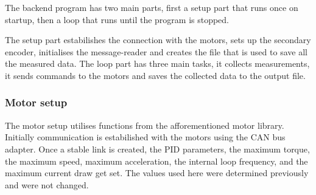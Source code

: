\documentclass[12pt]{article}
\begin{document}
The backend program has two main parts, first a setup part that runs once on startup, then a loop that runs until the program is stopped.

The setup part estabilishes the connection with the motors, sets up the secondary encoder, initialises the message-reader and creates the file that is used to save all the measured data. The loop part has three main tasks, it collects measurements, it sends commands to the motors and saves the collected data to the output file.  


\subsubsection{Motor setup}
The motor setup utilises functions from the afforementioned motor library. Initially communication is estabilished with the motors using the CAN bus adapter. Once a stable link is created, the PID parameters, the maximum torque, the maximum speed, maximum acceleration, the internal loop frequency, and the maximum current draw get set. The values used here were determined previously and were not changed. 
\end{document}
